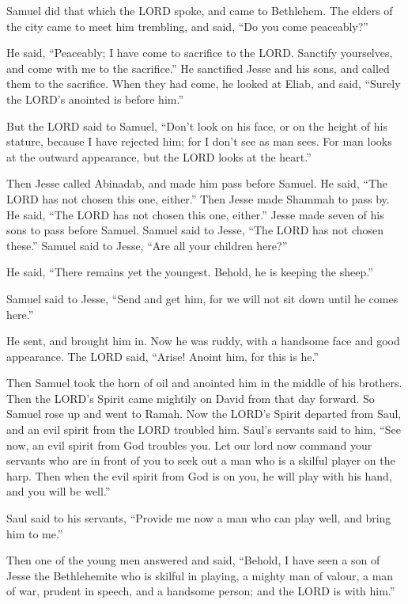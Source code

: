  Samuel did that which the LORD spoke, and came to
Bethlehem. The elders of the city came to meet him trembling, and said,
``Do you come peaceably?''

 He said, ``Peaceably; I have come to sacrifice to the
LORD. Sanctify yourselves, and come with me to the sacrifice.'' He
sanctified Jesse and his sons, and called them to the sacrifice.
 When they had come, he looked at Eliab, and said,
``Surely the LORD's anointed is before him.''

 But the LORD said to Samuel, ``Don't look on his face, or
on the height of his stature, because I have rejected him; for I don't
see as man sees. For man looks at the outward appearance, but the LORD
looks at the heart.''

 Then Jesse called Abinadab, and made him pass before
Samuel. He said, ``The LORD has not chosen this one, either.''
 Then Jesse made Shammah to pass by. He said, ``The LORD
has not chosen this one, either.''  Jesse made seven of
his sons to pass before Samuel. Samuel said to Jesse, ``The LORD has not
chosen these.''  Samuel said to Jesse, ``Are all your
children here?''

He said, ``There remains yet the youngest. Behold, he is keeping the
sheep.''

Samuel said to Jesse, ``Send and get him, for we will not sit down until
he comes here.''

 He sent, and brought him in. Now he was ruddy, with a
handsome face and good appearance. The LORD said, ``Arise! Anoint him,
for this is he.''

 Then Samuel took the horn of oil and anointed him in the
middle of his brothers. Then the LORD's Spirit came mightily on David
from that day forward. So Samuel rose up and went to Ramah.
 Now the LORD's Spirit departed from Saul, and an evil
spirit from the LORD troubled him.  Saul's servants said
to him, ``See now, an evil spirit from God troubles you. 
Let our lord now command your servants who are in front of you to seek
out a man who is a skilful player on the harp. Then when the evil spirit
from God is on you, he will play with his hand, and you will be well.''

 Saul said to his servants, ``Provide me now a man who
can play well, and bring him to me.''

 Then one of the young men answered and said, ``Behold, I
have seen a son of Jesse the Bethlehemite who is skilful in playing, a
mighty man of valour, a man of war, prudent in speech, and a handsome
person; and the LORD is with him.''

